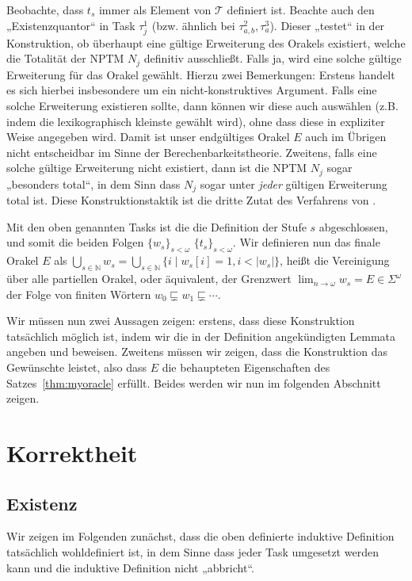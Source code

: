 Beobachte, dass $t_s$ immer als Element von $\mathcal T$ definiert ist.
Beachte auch den „Existenzquantor“ in Task $\tau^1_j$ (bzw. ähnlich bei $\tau^2_{a,b}, \tau^3_a$). Dieser „testet“ in der Konstruktion, ob überhaupt eine gültige Erweiterung des Orakels existiert, welche die Totalität der NPTM $N_j$ definitiv ausschließt. Falls ja, wird eine solche gültige Erweiterung für das Orakel gewählt.
Hierzu zwei Bemerkungen: Erstens handelt es sich hierbei insbesondere um ein nicht-konstruktives Argument. Falls eine solche Erweiterung existieren sollte, dann können wir diese auch auswählen (z.B. indem die lexikographisch kleinste gewählt wird), ohne dass diese in expliziter Weise angegeben wird.
Damit ist unser endgültiges Orakel $E$ auch im Übrigen nicht entscheidbar im Sinne der Berechenbarkeitstheorie.
Zweitens, falls eine solche gültige Erweiterung nicht existiert, dann ist die NPTM $N_j$ sogar „besonders total“, in dem Sinn dass $N_j$ sogar unter \emph{jeder} gültigen Erweiterung total ist. 
Diese Konstruktionstaktik ist die dritte Zutat des Verfahrens von \citeauthor{dose_np-completeness_2019}.

Mit den oben genannten Tasks ist die die Definition der Stufe $s$ abgeschlossen, und somit die beiden Folgen $\{w_s\}_{s<\omega}$ $\{t_s\}_{s<\omega}$.
Wir definieren nun das finale Orakel $E$ als $\bigcup_{s\in\mathbb N} w_s = \bigcup_{s\in\mathbb N} \{ i \mid w_s[i]=1, i<|w_s|\} $, heißt die Vereinigung über alle partiellen Orakel, oder äquivalent, der Grenzwert $\lim_{n\to\omega} w_s = E\in\Sigma^\omega$ der Folge von finiten Wörtern $w_0\sqsubsetneq  w_1\sqsubsetneq \cdots$.

Wir müssen nun zwei Aussagen zeigen: erstens, dass diese Konstruktion tatsächlich möglich ist, indem wir die in der Definition angekündigten Lemmata angeben und beweisen.
Zweitens müssen wir zeigen, dass die Konstruktion das Gewünschte leistet, also dass $E$ die behaupteten Eigenschaften des Satzes~\ref{thm:myoracle} erfüllt.
Beides werden wir nun im folgenden Abschnitt zeigen.

\section{Korrektheit}\label{sec:oracle-correctness}

\subsection*{Existenz}

Wir zeigen im Folgenden zunächst, dass die oben definierte induktive Definition tatsächlich wohldefiniert ist, in dem Sinne dass jeder Task umgesetzt werden kann und die induktive Definition nicht „abbricht“.

